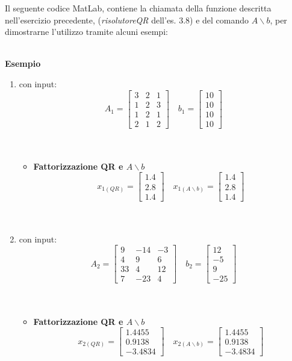 Il seguente codice MatLab, contiene la chiamata della funzione descritta nell'esercizio precedente, (\textit{risolutoreQR}  dell'es. 3.8) e del comando $A \backslash b$, per dimostrarne l'utilizzo tramite alcuni esempi:\\\
	
\textbf{Esempio}
\begin{enumerate} 
	\item con input:
		\[
		A_1 =\begin{bmatrix}
			3 & 2 & 1 \\
			1 & 2 & 3 \\
			1 & 2 & 1 \\
			2 & 1 & 2 
		\end{bmatrix} \quad
		b_1 =\begin{bmatrix}
			10 \\
			10 \\
			10 \\
			10
		\end{bmatrix}
		\]\\\
	\begin{itemize}
		\item \textbf{Fattorizzazione QR e $A \backslash b$}
			\[
			x_{1(QR)} =\begin{bmatrix}
				1.4 \\
				2.8 \\
				1.4
			\end{bmatrix} \quad
			x_{1(A \backslash b)} =\begin{bmatrix}
				1.4 \\
				2.8 \\
				1.4
			\end{bmatrix}
			\]\\\	
	\end{itemize}
	\item con input:
		\[
		A_2 =\begin{bmatrix}
			9  & -14 & -3 \\
			4  & 9	 & 6  \\
			33 & 4   & 12 \\
			7  & -23 & 4 
		\end{bmatrix} \quad
		b_2 =\begin{bmatrix}
			12  \\
			-5  \\
			9   \\
			-25
		\end{bmatrix}
		\]\\\
	\begin{itemize}
		\item \textbf{Fattorizzazione QR e $A \backslash b$}
			\[
			x_{2(QR)} =\begin{bmatrix}
				1.4455  \\
				0.9138  \\
				-3.4834
			\end{bmatrix} \quad
			x_{2(A \backslash b)} =\begin{bmatrix}
				1.4455  \\
				0.9138  \\
				-3.4834
			\end{bmatrix}
			\]	
	\end{itemize}
\end{enumerate}